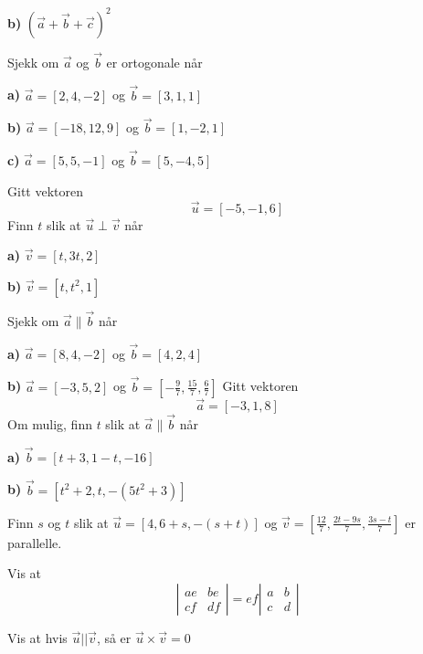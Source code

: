 \textbf{b)} $ (\vec{a}+ \vec{b}+\vec{c})^2$

\nes
{}
Sjekk om $ \vec{a} $ og $ \vec{b} $ er ortogonale når\os

\textbf{a)} $ \vec{a}=[2, 4, -2] $ og $ \vec{b}=[3, 1, 1] $\os

\textbf{b)} $ \vec{a}=[-18, 12, 9] $ og $ \vec{b}=[1, -2, 1] $\os

\textbf{c)} $ \vec{a}=[5, 5, -1] $ og $ \vec{b}=[5, -4, 5] $

Gitt vektoren
\[ \vec{u}=[-5, -1, 6] \]
Finn $ t $ slik at $ \vec{u}\perp \vec{v} $ når\os

\textbf{a)} $ \vec{v}=[t, 3t, 2] $\os

\textbf{b)} $ \vec{v}=[t, t^2, 1] $

Sjekk om $ \vec{a}\parallel\vec{b} $ når\os

\textbf{a)} $ \vec{a}=[8, 4, -2] $ og $ \vec{b}=[4, 2, 4] $\os

\textbf{b)} $ \vec{a}=[-3, 5, 2] $ og $ \vec{b}=\left[-\frac{9}{7}, \frac{15}{7}, \frac{6}{7}\right] $ 
\newpage
{}
Gitt vektoren 
\[ \vec{a}=[-3, 1, 8] \]
Om mulig, finn $ t $ slik at $ \vec{a}\parallel\vec{b} $ når\os

\textbf{a)} $ \vec{b}=[t+3, 1-t, -16] $\os

\textbf{b)} $ \vec{b}=[t^2+2, t, -(5t^2+3)] $

Finn $ s $ og $ t $ slik at $\vec{u}=[4, 6+s, -(s+t)] $ og $ \vec{v}=\left[\frac{12}{7}, \frac{2t-9s}{7}, \frac{3s-t}{7}\right] $ er parallelle. \os

\nes
{}
Vis at
\[  \left|\begin{matrix}
ae & be \\
cf & df
\end{matrix}\right|=ef\left|\begin{matrix}
a & b \\
c & d
\end{matrix}\right| \]

\begin{comment}
\opl{arparo}
Finn aralet til parallellogrammet utspent av (\textsl{Tips:} Bruk resultatet fra opg. \ref{vis22det}):

\textbf{a)} $ [-2, 7] $ og $ [12, 8] $

\textbf{b)} $ [-2, 4] $ og $ [24, -16] $\\
\end{comment}

Vis at hvis $ \vec{u}||\vec{v} $, så er $ \vec{u}\times\vec{v}=0 $

